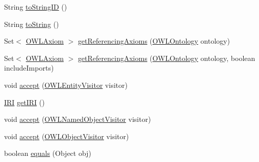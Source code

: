 \begin{DoxyCompactItemize}
\item 
String \hyperlink{classuk_1_1ac_1_1manchester_1_1cs_1_1owl_1_1owlapi_1_1_o_w_l2_datatype_impl_ac6a63ced96ffe9999fb8b07c08406ea4}{to\-String\-I\-D} ()
\item 
String \hyperlink{classuk_1_1ac_1_1manchester_1_1cs_1_1owl_1_1owlapi_1_1_o_w_l2_datatype_impl_a5a2848396ce9aaa84f2f402d2cdfca3a}{to\-String} ()
\item 
Set$<$ \hyperlink{interfaceorg_1_1semanticweb_1_1owlapi_1_1model_1_1_o_w_l_axiom}{O\-W\-L\-Axiom} $>$ \hyperlink{classuk_1_1ac_1_1manchester_1_1cs_1_1owl_1_1owlapi_1_1_o_w_l2_datatype_impl_a3fbdeab92b3f3b77111292fbf310a66c}{get\-Referencing\-Axioms} (\hyperlink{interfaceorg_1_1semanticweb_1_1owlapi_1_1model_1_1_o_w_l_ontology}{O\-W\-L\-Ontology} ontology)
\item 
Set$<$ \hyperlink{interfaceorg_1_1semanticweb_1_1owlapi_1_1model_1_1_o_w_l_axiom}{O\-W\-L\-Axiom} $>$ \hyperlink{classuk_1_1ac_1_1manchester_1_1cs_1_1owl_1_1owlapi_1_1_o_w_l2_datatype_impl_a551483a8989a7895282283b33ada3a1c}{get\-Referencing\-Axioms} (\hyperlink{interfaceorg_1_1semanticweb_1_1owlapi_1_1model_1_1_o_w_l_ontology}{O\-W\-L\-Ontology} ontology, boolean include\-Imports)
\item 
void \hyperlink{classuk_1_1ac_1_1manchester_1_1cs_1_1owl_1_1owlapi_1_1_o_w_l2_datatype_impl_ab0eb69fb2e7b369d04d1c54ce71d6903}{accept} (\hyperlink{interfaceorg_1_1semanticweb_1_1owlapi_1_1model_1_1_o_w_l_entity_visitor}{O\-W\-L\-Entity\-Visitor} visitor)
\item 
\hyperlink{classorg_1_1semanticweb_1_1owlapi_1_1model_1_1_i_r_i}{I\-R\-I} \hyperlink{classuk_1_1ac_1_1manchester_1_1cs_1_1owl_1_1owlapi_1_1_o_w_l2_datatype_impl_addbe00cd218432de52a115702709d9dd}{get\-I\-R\-I} ()
\item 
void \hyperlink{classuk_1_1ac_1_1manchester_1_1cs_1_1owl_1_1owlapi_1_1_o_w_l2_datatype_impl_a33c6a17e2f0a93c8c96a572d369bd55d}{accept} (\hyperlink{interfaceorg_1_1semanticweb_1_1owlapi_1_1model_1_1_o_w_l_named_object_visitor}{O\-W\-L\-Named\-Object\-Visitor} visitor)
\item 
void \hyperlink{classuk_1_1ac_1_1manchester_1_1cs_1_1owl_1_1owlapi_1_1_o_w_l2_datatype_impl_a3f3df66497447a37cdcb084e4c0ddd4a}{accept} (\hyperlink{interfaceorg_1_1semanticweb_1_1owlapi_1_1model_1_1_o_w_l_object_visitor}{O\-W\-L\-Object\-Visitor} visitor)
\item 
boolean \hyperlink{classuk_1_1ac_1_1manchester_1_1cs_1_1owl_1_1owlapi_1_1_o_w_l2_datatype_impl_a6cceffbee99c84874c87babf8b5eaf74}{equals} (Object obj)

\end{DoxyCompactItemize}
